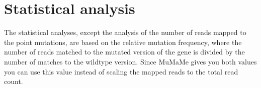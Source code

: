 % 


\section{Statistical analysis}

The statistical analyses, except the analysis of the number of reads mapped to the point mutations, are based on the relative mutation frequency, where the number of reads matched to the mutated version of the gene is divided by the number of matches to the wildtype version.
Since MuMaMe gives you both values you can use this value instead of scaling the mapped reads to the total read count. 

